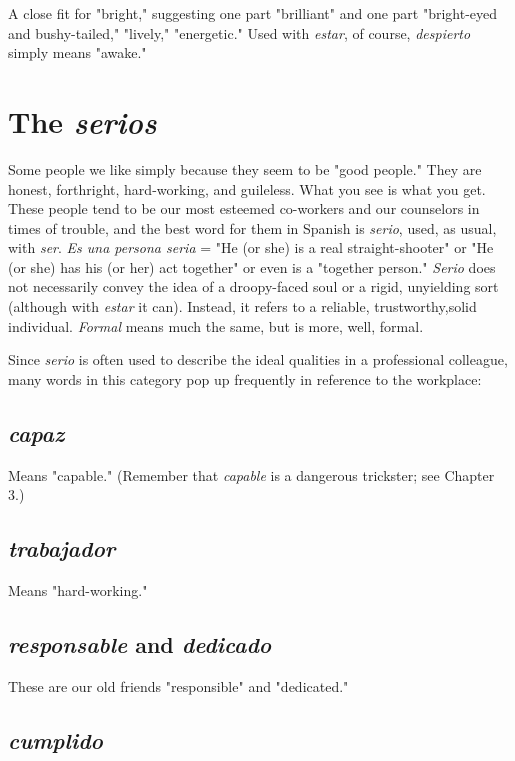 \documentclass[14pt,a4paper,oneside]{memoir}
\begin{document}
A close fit for "bright," suggesting one part "brilliant" and one part "bright-eyed and bushy-tailed," "lively," "energetic." Used with \emph{estar}, of course, \emph{despierto} simply means "awake."

\section{The \emph{serios}}

Some people we like simply because they seem to be "good
people." They are honest, forthright, hard-working, and guileless. What
you see is what you get. These people tend to be our most esteemed
co-workers and our counselors in times of trouble, and the best word
for them in Spanish is \emph{serio}, used, as usual, with \emph{ser}. \emph{Es una persona
seria} = "He (or she) is a real straight-shooter" or "He (or she) has his
(or her) act together" or even is a "together person." \emph{Serio} does not
necessarily convey the idea of a droopy-faced soul or a rigid, unyielding
sort (although with \emph{estar} it can). Instead, it refers to a reliable, trustworthy,solid individual. \emph{Formal} means much the same, but is more, well, formal.

Since \emph{serio} is often used to describe the ideal qualities in a
professional colleague, many words in this category pop up frequently
in reference to the workplace:

\subsection{\emph{capaz}}

Means "capable." (Remember that \emph{capable} is a dangerous trickster; see Chapter 3.)

\subsection{\emph{trabajador}}

Means "hard-working."

\subsection{\emph{responsable} and \emph{dedicado}}

These are our old friends "responsible" and "dedicated."

\subsection{\emph{cumplido}}
\end{document}
